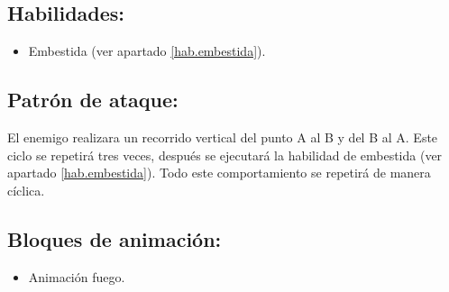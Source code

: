 \subsection{Habilidades:}
\begin{itemize}
	\item Embestida (ver apartado \ref{hab.embestida}).
	
\end{itemize}
\subsection{Patrón de ataque:}
El enemigo realizara un recorrido vertical del punto A al B y del B al A. Este ciclo se repetirá tres veces, después se ejecutará la habilidad de embestida (ver apartado \ref{hab.embestida}). Todo este comportamiento se repetirá de manera cíclica.
\subsection{Bloques de animación:}
	\begin{itemize}
		\item Animación fuego.
	\end{itemize}